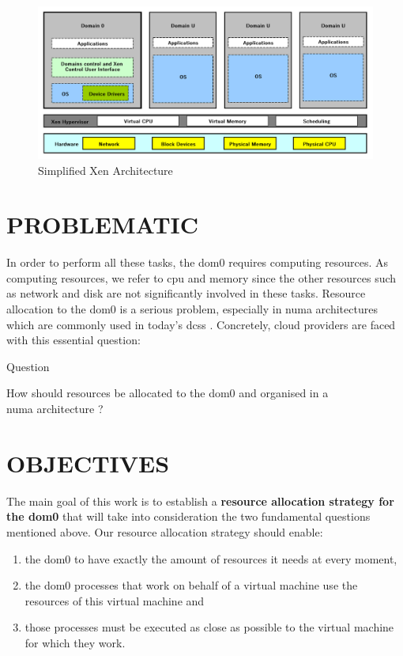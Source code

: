 \begin{figure}[!h]
	\centering
    \includegraphics[width=\linewidth]{fig01/xen_simple.pdf}
    \caption{Simplified Xen Architecture}
    \label{fig:arch_simple_xen}
\end{figure}

\section*{PROBLEMATIC}

In order to perform all these tasks, the dom0 requires computing resources. As computing resources, we refer to \acrshort{cpu} and memory since the other resources such as network and disk are not significantly involved in these tasks. Resource allocation to the dom0 is a serious problem, especially in \acrshort{numa} architectures which are commonly used in today's \glspl{dc}s \citep{numa-most}. Concretely, cloud providers are faced with this essential question: 

\begin{bidentidad}{Question}
\begin{itemize}
    \centering How should resources be allocated to the dom0 and organised in a \\ \acrshort{numa} architecture ? 
\end{itemize}
\end{bidentidad}

\section*{OBJECTIVES}
The main goal of this work is to establish a \textbf{resource allocation strategy for the dom0} that will take into consideration the two fundamental questions mentioned above. Our resource allocation strategy should enable: 

\begin{enumerate}
    \item the dom0 to have exactly the amount of resources it needs at every moment,
    \item the dom0 processes that work on behalf of a virtual machine use the resources of this virtual machine and 
    \item those processes must be executed as close as possible to the virtual machine for which they work.
\end{enumerate}


